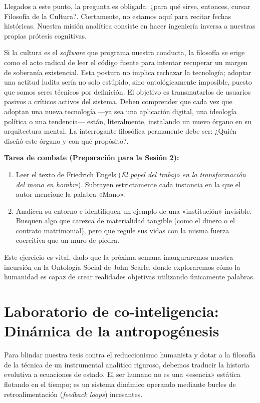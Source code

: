 Llegados a este punto, la pregunta es obligada: ¿para qué sirve, entonces, cursar Filosofía de la Cultura?. Ciertamente, no estamos aquí para recitar fechas históricas. Nuestra misión analítica consiste en hacer ingeniería inversa a nuestras propias prótesis cognitivas.

Si la cultura es el \textit{software} que programa nuestra conducta, la filosofía se erige como el acto radical de leer el código fuente para intentar recuperar un margen de soberanía existencial. Esta postura no implica rechazar la tecnología; adoptar una actitud ludita sería no solo estúpido, sino ontológicamente imposible, puesto que somos seres técnicos por definición. El objetivo es transmutarlos de usuarios pasivos a críticos activos del sistema. Deben comprender que cada vez que adoptan una nueva tecnología —ya sea una aplicación digital, una ideología política o una tendencia— están, literalmente, instalando un nuevo órgano en su arquitectura mental. La interrogante filosófica permanente debe ser: ¿Quién diseñó este órgano y con qué propósito?.

\begin{actividad}
\textbf{Tarea de combate (Preparación para la Sesión 2):} 
\begin{enumerate}
    \item Leer el texto de Friedrich Engels (\textit{El papel del trabajo en la transformación del mono en hombre}). Subrayen estrictamente cada instancia en la que el autor mencione la palabra «Mano».
    \item Analicen su entorno e identifiquen un ejemplo de una «institución» invisible. Busquen algo que carezca de materialidad tangible (como el dinero o el contrato matrimonial), pero que regule sus vidas con la misma fuerza coercitiva que un muro de piedra.
\end{enumerate}
Este ejercicio es vital, dado que la próxima semana inauguraremos nuestra incursión en la Ontología Social de John Searle, donde exploraremos cómo la humanidad es capaz de crear realidades objetivas utilizando únicamente palabras.
\end{actividad}

\vfill
\newpage

\section{Laboratorio de co-inteligencia: Dinámica de la antropogénesis}
\label{sec:lab_antropogenesis}

Para blindar nuestra tesis contra el reduccionismo humanista y dotar a la filosofía de la técnica de un instrumental analítico riguroso, debemos traducir la historia evolutiva a ecuaciones de estado. El ser humano no es una «esencia» estática flotando en el tiempo; es un sistema dinámico operando mediante bucles de retroalimentación (\textit{feedback loops}) incesantes.

